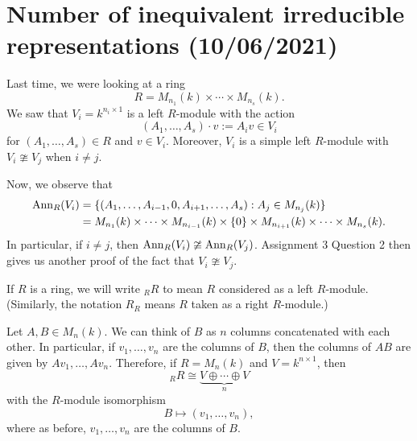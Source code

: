 \section{Number of inequivalent irreducible representations (10/06/2021)}
Last time, we were looking at a ring 
\[ R = M_{n_1}(k) \times \cdots \times M_{n_s}(k). \] 
We saw that $V_i = k^{n_i \times 1}$ is a left $R$-module with the action 
\[ (A_1, \dots, A_s) \cdot v := A_i v \in V_i \] 
for $(A_1, \dots, A_s) \in R$ and $v \in V_i$. Moreover, $V_i$ is a 
simple left $R$-module with $V_i \ncong V_j$ when $i \neq j$. 

Now, we observe that 
\begin{align*} 
    \operatorname{Ann}_R(V_i) &= \{(A_1, \dots, A_{i-1}, 0, A_{i+1}, \dots, A_s) : 
    A_j \in M_{n_j}(k)\} \\
    &= M_{n_1}(k) \times \cdots \times M_{n_{i-1}}(k) \times \{0\} 
    \times M_{n_{i+1}}(k) \times \cdots \times M_{n_s}(k). 
\end{align*} 
In particular, if $i \neq j$, then $\operatorname{Ann}_R(V_i) \ncong \operatorname{Ann}_R(V_j)$. 
Assignment 3 Question 2 then gives us another proof of the fact that 
$V_i \ncong V_j$. 

\begin{defn}{}
    If $R$ is a ring, we will write ${}_R R$ to mean $R$ considered as a left 
    $R$-module. (Similarly, the notation $R_R$ means $R$ taken as a right 
    $R$-module.)
\end{defn}

Let $A, B \in M_n(k)$. We can think of $B$ as $n$ columns concatenated 
with each other. In particular, if $v_1, \dots, v_n$ are the columns of $B$, 
then the columns of $AB$ are given by $Av_1, \dots, Av_n$. 
Therefore, if $R = M_n(k)$ and $V = k^{n \times 1}$, then 
\[ {}_R R \cong \underbrace{V \oplus \cdots \oplus V}_{n} \] 
with the $R$-module isomorphism 
\[ B \mapsto (v_1, \dots, v_n), \] 
where as before, $v_1, \dots, v_n$ are the columns of $B$. 

